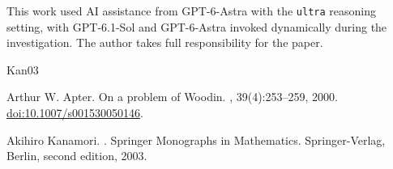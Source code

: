 \documentclass[10pt,a4paper]{amsart}
\theoremstyle{definition}
\theoremstyle{remark}
\begin{document}
This work used AI assistance from GPT-6-Astra with the \texttt{ultra} reasoning setting,
with GPT-6.1-Sol and GPT-6-Astra invoked dynamically during the investigation.
The author takes
full responsibility for the paper.

\begin{thebibliography}{Kan03}

    Arthur W. Apter.
    \newblock On a problem of Woodin.
    , 39(4):253--259, 2000.
    \newblock \href{https://doi.org/10.1007/s001530050146}{doi:10.1007/s001530050146}.

    Akihiro Kanamori.
    .
    \newblock Springer Monographs in Mathematics. Springer-Verlag, Berlin, second edition, 2003.
\end{thebibliography}
\end{document}
